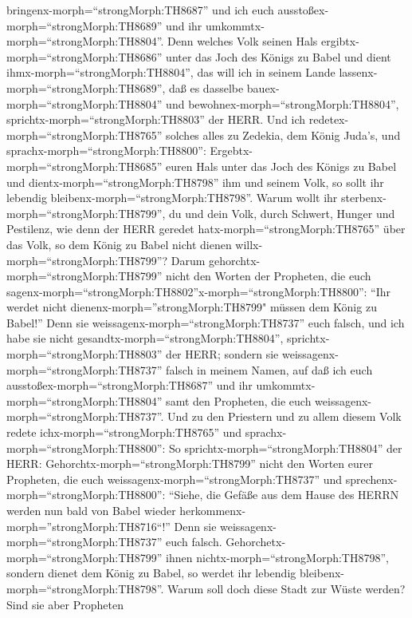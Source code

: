 bringenx-morph=``strongMorph:TH8687'' und ich euch
ausstoßex-morph=``strongMorph:TH8689'' und ihr
umkommtx-morph=``strongMorph:TH8804''.  Denn welches Volk
seinen Hals ergibtx-morph=``strongMorph:TH8686'' unter das Joch des
Königs zu Babel und dient ihmx-morph=``strongMorph:TH8804'', das will
ich in seinem Lande lassenx-morph=``strongMorph:TH8689'', daß es
dasselbe bauex-morph=``strongMorph:TH8804'' und
bewohnex-morph=``strongMorph:TH8804'',
sprichtx-morph=``strongMorph:TH8803'' der HERR.  Und ich
redetex-morph=``strongMorph:TH8765'' solches alles zu Zedekia, dem König
Juda's, und sprachx-morph=``strongMorph:TH8800'':
Ergebtx-morph=``strongMorph:TH8685'' euren Hals unter das Joch des
Königs zu Babel und dientx-morph=``strongMorph:TH8798'' ihm und seinem
Volk, so sollt ihr lebendig bleibenx-morph=``strongMorph:TH8798''.
 Warum wollt ihr sterbenx-morph=``strongMorph:TH8799'', du
und dein Volk, durch Schwert, Hunger und Pestilenz, wie denn der HERR
geredet hatx-morph=``strongMorph:TH8765'' über das Volk, so dem König zu
Babel nicht dienen willx-morph=``strongMorph:TH8799''? 
Darum gehorchtx-morph=``strongMorph:TH8799'' nicht den Worten der
Propheten, die euch
sagenx-morph=``strongMorph:TH8802''x-morph=``strongMorph:TH8800'': ``Ihr
werdet nicht dienenx-morph=''strongMorph:TH8799" müssen dem König zu
Babel!'' Denn sie weissagenx-morph=``strongMorph:TH8737'' euch falsch,
 und ich habe sie nicht
gesandtx-morph=``strongMorph:TH8804'',
sprichtx-morph=``strongMorph:TH8803'' der HERR; sondern sie
weissagenx-morph=``strongMorph:TH8737'' falsch in meinem Namen, auf daß
ich euch ausstoßex-morph=``strongMorph:TH8687'' und ihr
umkommtx-morph=``strongMorph:TH8804'' samt den Propheten, die euch
weissagenx-morph=``strongMorph:TH8737''.  Und zu den
Priestern und zu allem diesem Volk redete
ichx-morph=``strongMorph:TH8765'' und
sprachx-morph=``strongMorph:TH8800'': So
sprichtx-morph=``strongMorph:TH8804'' der HERR:
Gehorchtx-morph=``strongMorph:TH8799'' nicht den Worten eurer Propheten,
die euch weissagenx-morph=``strongMorph:TH8737'' und
sprechenx-morph=``strongMorph:TH8800'': ``Siehe, die Gefäße aus dem
Hause des HERRN werden nun bald von Babel wieder
herkommenx-morph=''strongMorph:TH8716``!'' Denn sie
weissagenx-morph=``strongMorph:TH8737'' euch falsch. 
Gehorchetx-morph=``strongMorph:TH8799'' ihnen
nichtx-morph=``strongMorph:TH8798'', sondern dienet dem König zu Babel,
so werdet ihr lebendig bleibenx-morph=``strongMorph:TH8798''. Warum soll
doch diese Stadt zur Wüste werden?  Sind sie aber Propheten
